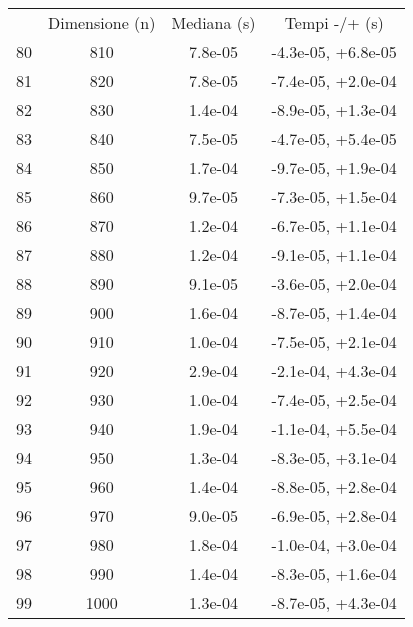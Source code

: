 \begin{table}
\centering
\begin{adjustbox}{width=1\textwidth/2}
\begin{tabular}{|c|c|c|c|}
\hline
 & Dimensione (n) & Mediana (s) & Tempi -/+ (s) \\
80 & 810 & 7.8e-05 & -4.3e-05, +6.8e-05 \\
\cline{1-4}
81 & 820 & 7.8e-05 & -7.4e-05, +2.0e-04 \\
\cline{1-4}
82 & 830 & 1.4e-04 & -8.9e-05, +1.3e-04 \\
\cline{1-4}
83 & 840 & 7.5e-05 & -4.7e-05, +5.4e-05 \\
\cline{1-4}
84 & 850 & 1.7e-04 & -9.7e-05, +1.9e-04 \\
\cline{1-4}
85 & 860 & 9.7e-05 & -7.3e-05, +1.5e-04 \\
\cline{1-4}
86 & 870 & 1.2e-04 & -6.7e-05, +1.1e-04 \\
\cline{1-4}
87 & 880 & 1.2e-04 & -9.1e-05, +1.1e-04 \\
\cline{1-4}
88 & 890 & 9.1e-05 & -3.6e-05, +2.0e-04 \\
\cline{1-4}
89 & 900 & 1.6e-04 & -8.7e-05, +1.4e-04 \\
\cline{1-4}
90 & 910 & 1.0e-04 & -7.5e-05, +2.1e-04 \\
\cline{1-4}
91 & 920 & 2.9e-04 & -2.1e-04, +4.3e-04 \\
\cline{1-4}
92 & 930 & 1.0e-04 & -7.4e-05, +2.5e-04 \\
\cline{1-4}
93 & 940 & 1.9e-04 & -1.1e-04, +5.5e-04 \\
\cline{1-4}
94 & 950 & 1.3e-04 & -8.3e-05, +3.1e-04 \\
\cline{1-4}
95 & 960 & 1.4e-04 & -8.8e-05, +2.8e-04 \\
\cline{1-4}
96 & 970 & 9.0e-05 & -6.9e-05, +2.8e-04 \\
\cline{1-4}
97 & 980 & 1.8e-04 & -1.0e-04, +3.0e-04 \\
\cline{1-4}
98 & 990 & 1.4e-04 & -8.3e-05, +1.6e-04 \\
\cline{1-4}
99 & 1000 & 1.3e-04 & -8.7e-05, +4.3e-04 \\
\cline{1-4}
\end{tabular}
\end{adjustbox}
\end{table}

